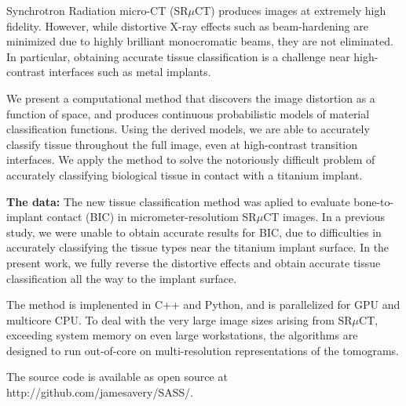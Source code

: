 Synchrotron Radiation micro-CT (SR$\mu$CT) produces images at
extremely high fidelity.  However, while distortive X-ray effects such
as beam-hardening are minimized due to highly brilliant monocromatic
beams, they are not eliminated. In particular, obtaining accurate
tissue classification is a challenge near high-contrast interfaces
such as metal implants.

We present a computational method that discovers the image distortion as a function of space,
and produces continuous probabilistic models of material classification functions.
Using the derived models, we are able to accurately classify tissue throughout the full
image, even at high-contrast transition interfaces.
% 
We apply the method to solve the notoriously difficult problem of accurately classifying
biological tissue in contact with a titanium implant. 
  
{\bf The data:}
The new tissue classification method was aplied to evaluate
bone-to-implant contact (BIC) in micrometer-resolutiom SR$\mu$CT images.
In a previous study\cite{sporring}, we were unable to obtain accurate
results for BIC, due to difficulties in accurately classifying the
tissue types near the titanium implant surface. In the present work,
we fully reverse the distortive effects and obtain accurate tissue classification
all the way to the implant surface.

The method is implenented in C++ and Python, and is parallelized for GPU and multicore CPU.
To deal with the very large image sizes arising from SR$\mu$CT, exceeding system
memory on even large workstations, the algorithms are designed to run
out-of-core on multi-resolution representations of the tomograms.

The source code is available as open source at http://github.com/jamesavery/SASS/.



